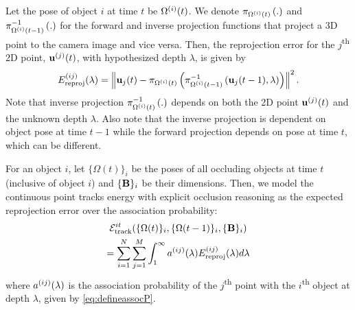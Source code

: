 Let the pose of object $i$ at time $t$ be $\Omega^{(i)}(t)$. We denote $\pi_{\Omega^{(i)}(t)}\left(.\right)$ and $\pi^{-1}_{\Omega^{(i)}(t-1)}\left(.\right)$ for the forward and inverse projection functions that project a 3D point to the camera image and vice versa. Then, the reprojection error for the $j$\textsuperscript{th} 2D point, $\mathbf{u}^{(j)}(t)$, with hypothesized depth $\lambda$, is given by
\begin{equation}
E^{(ij)}_{\text{reproj}}(\lambda) = \left\|\mathbf{u}_j(t) - \pi_{\Omega^{(i)}(t)}\left(\pi^{-1}_{\Omega^{(i)}(t-1)}\left(\mathbf{u}_j(t-1), \lambda\right)\right)\right\|^2.
\label{eq:reprojerror}
\end{equation}
Note that inverse projection $\pi^{-1}_{\Omega^{(i)}(t)}\left(.\right)$ depends on both the 2D point $\mathbf{u}^{(j)}(t)$ and the unknown depth $\lambda$. Also note that the inverse projection is dependent on object pose at time $t-1$ while the forward projection depends on pose at time $t$, which can be different.

For an object $i$, let $\{ \Omega (t) \}_i$ be the poses of all occluding objects at time $t$ (inclusive of object $i$) and $ \{ \mathbf{B} \}_i$ be their dimensions. Then, we model the continuous point tracks energy with explicit occlusion reasoning as the expected reprojection error over the association probability:
\begin{multline}
  \mathcal{E}^{it}_{\text{track}}(\{ \Omega (t) \}_i, \{ \Omega (t-1) \}_i, \{ \mathbf{B} \}_i )
  \\
    = \sum_{i=1}^{N} 
    \sum_{j = 1}^{M}
    \int_1^\infty a^{(ij)}(\lambda)E^{(ij)}_{\text{reproj}}(\lambda) d\lambda
\end{multline}
where $a^{(ij)}(\lambda)$ is the association probability of the $j$\textsuperscript{th} point with the $i$\textsuperscript{th} object at depth $\lambda$, given by \eqref{eq:defineassocP}.



